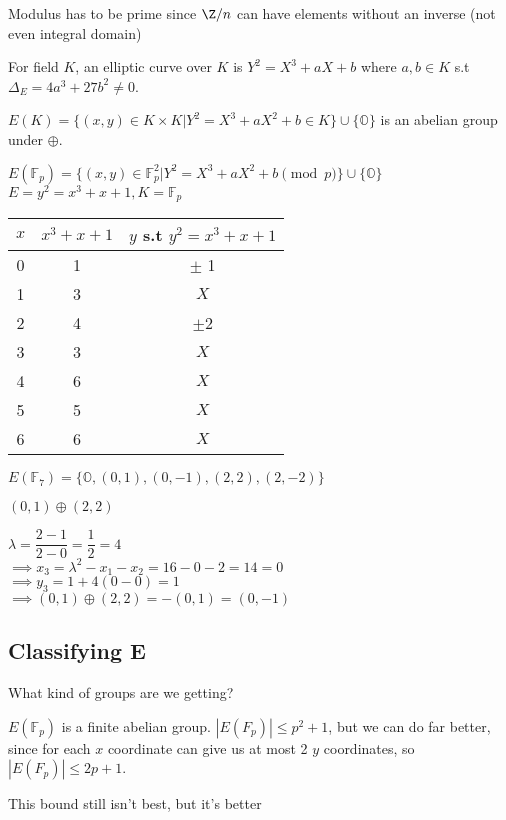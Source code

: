 \documentclass[10pt]{article}
\newcommand{\F}{\mathbb{F}}
\renewcommand{\O}{\mathbb{O}}
\begin{document}
\begin{rmk}
    Modulus has to be prime since $\Z/n$ can have elements without an inverse (not even integral domain)
\end{rmk}

\begin{defn}
    For field $K$, an elliptic curve over $K$ is $Y^2 = X^3 + aX + b$ where $a, b \in K$ s.t $\Delta_E = 4a^3 + 27b^2 \neq 0$.
\end{defn}

$E(K) = \{(x, y) \in K \times K | Y^2 = X^3 + aX^2 + b \in K\} \cup \{\O\}$ is an abelian group under $\oplus$. 

\begin{exm*}
    $E(\F_p) = \{(x, y) \in \F_p^2 | Y^2 = X^3 + aX^2 + b\pmod{p}\} \cup \{\O\}$\\
    $E = y^2 = x^3 + x + 1, K = \F_p$
\end{exm*}

\begin{tabular}{c|c|c}
    $x$ & $x^3 + x + 1$ & $y$ s.t $y^2 = x^3 + x + 1$\\
    \hline
    0 & 1 & $\pm$ 1\\
    1 & 3 & $X$\\
    2 & 4 & $\pm$2\\
    3 & 3 & $X$\\
    4 & 6 & $X$\\
    5 & 5 & $X$\\
    6 & 6 & $X$\\
\end{tabular}

$E(\F_7) = \{\O, (0, 1), (0, -1), (2, 2), (2, -2)\}$

$(0, 1) \oplus (2, 2)$

$\lambda = \dfrac{2-1}{2-0} = \dfrac{1}{2} = 4$\\
$\implies x_3 = \lambda^2 - x_1 - x_2 = 16 - 0 - 2 = 14 = 0$\\
$\implies y_3 = 1 + 4(0 - 0) = 1$\\
$\implies (0, 1) \oplus (2, 2) = -(0, 1) = (0, -1)$

\subsection{Classifying E} What kind of groups are we getting?

\begin{exm*}
    $E(\F_p)$ is a finite abelian group. $|E(F_p)| \leq p^2 + 1$, but we can do far better, since for each $x$ coordinate can give us at most 2 $y$ coordinates, so $|E(F_p)| \leq 2p + 1$.
\end{exm*}
This bound still isn't best, but it's better
\end{document}
